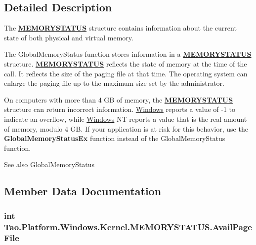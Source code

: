 \subsection{Detailed Description}
The {\bfseries \hyperlink{struct_tao_1_1_platform_1_1_windows_1_1_kernel_1_1_m_e_m_o_r_y_s_t_a_t_u_s}{MEMORYSTATUS}} structure contains information about the current state of both physical and virtual memory. 

The GlobalMemoryStatus function stores information in a {\bfseries \hyperlink{struct_tao_1_1_platform_1_1_windows_1_1_kernel_1_1_m_e_m_o_r_y_s_t_a_t_u_s}{MEMORYSTATUS}} structure. {\bfseries \hyperlink{struct_tao_1_1_platform_1_1_windows_1_1_kernel_1_1_m_e_m_o_r_y_s_t_a_t_u_s}{MEMORYSTATUS}} reflects the state of memory at the time of the call. It reflects the size of the paging file at that time. The operating system can enlarge the paging file up to the maximum size set by the administrator. 

On computers with more than 4 GB of memory, the {\bfseries \hyperlink{struct_tao_1_1_platform_1_1_windows_1_1_kernel_1_1_m_e_m_o_r_y_s_t_a_t_u_s}{MEMORYSTATUS}} structure can return incorrect information. \hyperlink{namespace_tao_1_1_platform_1_1_windows}{Windows} reports a value of -\/1 to indicate an overflow, while \hyperlink{namespace_tao_1_1_platform_1_1_windows}{Windows} NT reports a value that is the real amount of memory, modulo 4 GB. If your application is at risk for this behavior, use the {\bfseries GlobalMemoryStatusEx} function instead of the GlobalMemoryStatus function. 

\begin{DoxySeeAlso}{See also}
GlobalMemoryStatus


\end{DoxySeeAlso}


\subsection{Member Data Documentation}
\hypertarget{struct_tao_1_1_platform_1_1_windows_1_1_kernel_1_1_m_e_m_o_r_y_s_t_a_t_u_s_a6e824627bf4c515c1b924f139dee9166}{
\subsubsection[{AvailPageFile}]{\setlength{\rightskip}{0pt plus 5cm}int {\bf Tao.Platform.Windows.Kernel.MEMORYSTATUS.AvailPageFile}}}
\label{struct_tao_1_1_platform_1_1_windows_1_1_kernel_1_1_m_e_m_o_r_y_s_t_a_t_u_s_a6e824627bf4c515c1b924f139dee9166}


